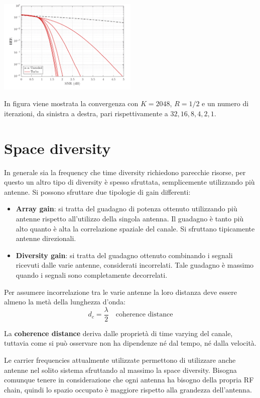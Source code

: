 \begin{center}
    
\includegraphics[width=0.5\textwidth]{imgs/turbo_code_ber.png}
\end{center}

In figura viene mostrata la convergenza con $K=2048$, $R=1/2$ e un numero di iterazioni, da sinistra a destra, pari rispettivamente a $32, 16, 8, 4, 2, 1$.


\section*{Space diversity}

In generale sia la frequency che time diversity richiedono parecchie risorse, per questo un altro tipo di diversity è spesso sfruttata, semplicemente utilizzando più antenne. Si possono sfruttare due tipologie di gain differenti:
\begin{itemize}
    \item \textbf{Array gain}: si tratta del guadagno di potenza ottenuto utilizzando più antenne rispetto all'utilizzo della singola antenna. Il guadagno è tanto più alto quanto è alta la correlazione spaziale del canale. Si sfruttano tipicamente antenne direzionali.
    \item \textbf{Diversity gain}: si tratta del guadagno ottenuto combinando i segnali ricevuti dalle varie antenne, considerati incorrelati. Tale guadagno è massimo quando i segnali sono completamente decorrelati. 
\end{itemize} 

Per assumere incorrelazione tra le varie antenne la loro distanza deve essere almeno la metà della lunghezza d'onda:
\[
    d_c = \frac{\lambda}{2} \quad \text{coherence distance}
\]  

La \textbf{coherence distance} deriva dalle proprietà di time varying del canale, tuttavia come si può osservare non ha dipendenze né dal tempo, né dalla velocità.

Le carrier frequencies attualmente utilizzate permettono di utilizzare anche antenne nel solito sistema sfruttando al massimo la space diversity. Bisogna comunque tenere in considerazione che ogni antenna ha bisogno della propria RF chain, quindi lo spazio occupato è maggiore rispetto alla grandezza dell'antenna.



